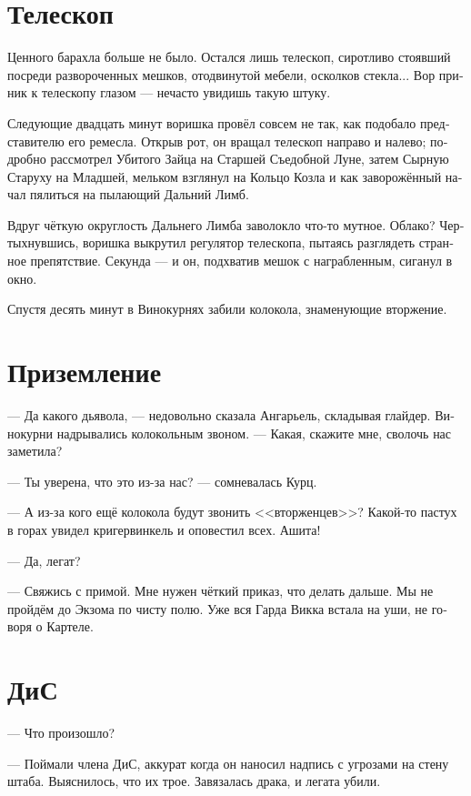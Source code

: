 \documentclass[a4paper,12pt,fleqn]{book}\usepackage{cooltooltips}\usepackage{polyglossia}\setdefaultlanguage[babelshorthands=true]{russian}\setotherlanguage{english}\defaultfontfeatures{Ligatures=TeX,Mapping=tex-text} \usepackage{xcolor}\definecolor{lightgray}{HTML}{bbbbbb}\color{lightgray}\newcommand{\ml}[3]{\textenglish{\textcolor{black}{#3}}}
\begin{document}
\section{Телескоп}

Ценного барахла больше не было.
Остался лишь телескоп, сиротливо стоявший посреди развороченных мешков, отодвинутой мебели, осколков стекла...
Вор приник к телескопу глазом --- нечасто увидишь такую штуку.

Следующие двадцать минут воришка провёл совсем не так, как подобало представителю его ремесла.
Открыв рот, он вращал телескоп направо и налево;
подробно рассмотрел Убитого Зайца на Старшей Съедобной Луне, затем Сырную Старуху на Младшей, мельком взглянул на Кольцо Козла и как заворожённый начал пялиться на пылающий Дальний Лимб.

Вдруг чёткую округлость Дальнего Лимба заволокло что-то мутное.
Облако?
Чертыхнувшись, воришка выкрутил регулятор телескопа, пытаясь разглядеть странное препятствие.
Секунда --- и он, подхватив мешок с награбленным, сиганул в окно.

Спустя десять минут в Винокурнях забили колокола, знаменующие вторжение.

\section{Приземление}

--- Да какого дьявола, --- недовольно сказала Ангарьель, складывая глайдер.
Винокурни надрывались колокольным звоном.
--- Какая, скажите мне, сволочь нас заметила?

--- Ты уверена, что это из-за нас? --- сомневалась Курц.

--- А из-за кого ещё колокола будут звонить <<вторженцев>>?
Какой-то пастух в горах увидел кригервинкель и оповестил всех.
Ашита!

--- Да, легат?

--- Свяжись с примой.
Мне нужен чёткий приказ, что делать дальше.
Мы не пройдём до Экзома по чисту полю.
Уже вся Гарда Викка встала на уши, не говоря о Картеле.

\section{ДиС}

--- Что произошло?

--- Поймали члена ДиС, аккурат когда он наносил надпись с угрозами на стену штаба.%
Выяснилось, что их трое.
Завязалась драка, и легата убили.
\end{document}
